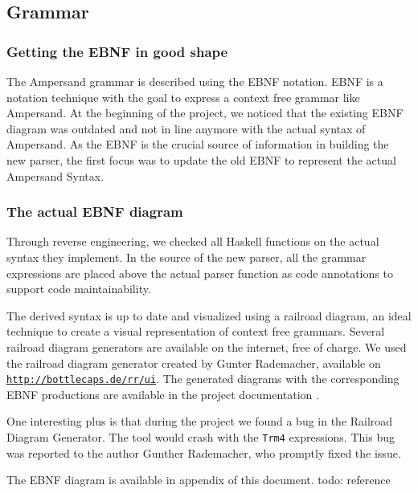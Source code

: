 
\subsection{Grammar}
\label{subsec:analysis-grammar}

\subsubsection{Getting the EBNF in good shape}
%
%
The Ampersand grammar is described using the EBNF notation. 
EBNF is a notation technique with the goal to express a context free grammar like Ampersand.
At the beginning of the project, we noticed that the existing EBNF diagram was outdated and not in line anymore with the actual syntax of Ampersand.
As the EBNF is the crucial source of information in building the new parser, the first focus was to update the old EBNF to represent the actual Ampersand Syntax.

\subsubsection{The actual EBNF diagram}
Through reverse engineering, we checked all Haskell functions on the actual syntax they implement.
In the source of the new parser, all the grammar expressions are placed above the actual parser function as code annotations to support code maintainability.

The derived syntax is up to date and visualized using a railroad diagram, an ideal technique to create a visual representation of context free grammars.
Several railroad diagram generators are available on the internet, free of charge.
We used the railroad diagram generator created by Gunter Rademacher, available on \texttt{\url{http://bottlecaps.de/rr/ui}}.
The generated diagrams with the corresponding EBNF productions are available in the project documentation .

One interesting plus is that during the project we found a bug in the Railroad Diagram Generator.
The tool would crash with the \texttt{Trm4} expressions.
This bug was reported to the author Gunther Rademacher, who promptly fixed the issue.

The EBNF diagram is available in appendix of this document. todo: reference
